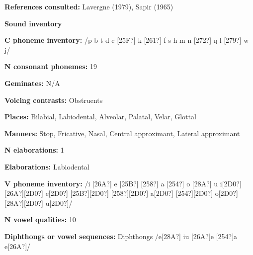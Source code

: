 \begin{styleBody}
\textbf{References consulted: }Lavergne (1979), Sapir (1965)
\end{styleBody}

\begin{styleBody}
\textbf{Sound inventory}
\end{styleBody}

\begin{styleBody}
\textbf{C phoneme inventory:} /p b t d c [25F?] k [261?] f s h m n [272?] ŋ l [279?] w j/
\end{styleBody}

\begin{styleBody}
\textbf{N consonant phonemes:} 19
\end{styleBody}

\begin{styleBody}
\textbf{Geminates:} N/A
\end{styleBody}

\begin{styleBody}
\textbf{Voicing contrasts:} Obstruents
\end{styleBody}

\begin{styleBody}
\textbf{Places:} Bilabial, Labiodental, Alveolar, Palatal, Velar, Glottal
\end{styleBody}

\begin{styleBody}
\textbf{Manners:} Stop, Fricative, Nasal, Central approximant, Lateral approximant
\end{styleBody}

\begin{styleBody}
\textbf{N elaborations:} 1
\end{styleBody}

\begin{styleBody}
\textbf{Elaborations:} Labiodental
\end{styleBody}

\begin{styleBody}
\textbf{V phoneme inventory:} /i [26A?] e [25B?] [258?] a [254?] o [28A?] u i[2D0?] [26A?][2D0?] e[2D0?] [25B?][2D0?] [258?][2D0?] a[2D0?] [254?][2D0?] o[2D0?] [28A?][2D0?] u[2D0?]/
\end{styleBody}

\begin{styleBody}
\textbf{N vowel qualities:} 10
\end{styleBody}

\begin{styleBody}
\textbf{Diphthongs or vowel sequences:} Diphthongs /e[28A?] iu [26A?]e [254?]a e[26A?]/
\end{styleBody}

